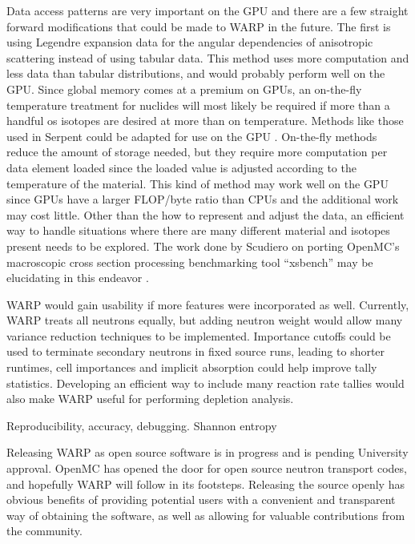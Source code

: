 Data access patterns are very important on the GPU and there are a few straight forward modifications that could be made to WARP in the future.  The first is using Legendre expansion data for the angular dependencies of anisotropic scattering instead of using tabular data.  This method uses more computation and less data than tabular distributions, and would probably perform well on the GPU.  Since global memory comes at a premium on GPUs, an on-the-fly temperature treatment for nuclides will most likely be required if more than a handful os isotopes are desired at more than on temperature.  Methods like those used in Serpent could be adapted for use on the GPU \cite{serpent}.  On-the-fly methods reduce the amount of storage needed, but they require more computation per data element loaded since the loaded value is adjusted according to the temperature of the material.  This kind of method may work well on the GPU since GPUs have a larger FLOP/byte ratio than CPUs and the additional work may cost little.  Other than the how to represent and adjust the data, an efficient way to handle situations where there are many different material and isotopes present needs to be explored.  The work done by Scudiero on porting OpenMC's macroscopic cross section processing benchmarking tool ``xsbench'' may be elucidating in this endeavor \cite{openmc,scudiero}.

WARP would gain usability if more features were incorporated as well.  Currently, WARP treats all neutrons equally, but adding neutron weight would allow many variance reduction techniques to be implemented.  Importance cutoffs could be used to terminate secondary neutrons in fixed source runs, leading to shorter runtimes, cell importances and implicit absorption could help improve tally statistics.  Developing an efficient way to include many reaction rate tallies would also make WARP useful for performing depletion analysis.

Reproducibility, accuracy, debugging.  Shannon entropy

Releasing WARP as open source software is in progress and is pending University approval.  OpenMC has opened the door for open source neutron transport codes, and hopefully WARP will follow in its footsteps.  Releasing the source openly has obvious benefits of providing potential users with a convenient and transparent way of obtaining the software, as well as allowing for valuable contributions from the community.  



